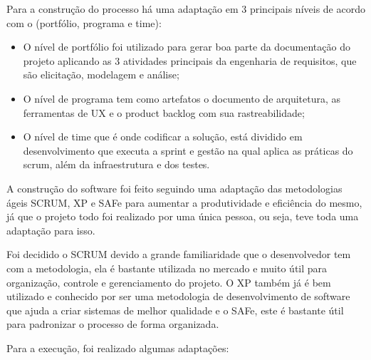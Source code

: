 Para a construção do processo há uma adaptação em 3 principais níveis de acordo com o \cite{safe} (portfólio, programa e time):

\begin{itemize}
  \item O nível de portfólio foi utilizado para gerar boa parte da documentação do projeto aplicando as 3 atividades principais da engenharia de requisitos, que são elicitação, modelagem e análise;
  \item O nível de programa tem como artefatos o documento de arquitetura, as ferramentas de UX e o product backlog com sua rastreabilidade;
  \item O nível de time que é onde codificar a solução, está dividido em desenvolvimento que executa a sprint e gestão na qual aplica as práticas do scrum, além da infraestrutura e dos testes.
\end{itemize}

A construção do software foi feito seguindo uma adaptação das metodologias ágeis SCRUM, XP e SAFe para aumentar a
produtividade e eficiência do mesmo, já que o projeto todo foi realizado por uma única pessoa, ou seja, teve toda uma adaptação para isso.

Foi decidido o SCRUM devido a grande familiaridade que o desenvolvedor tem com a metodologia, ela é bastante utilizada no mercado e muito útil para organização, controle e gerenciamento do projeto. O XP também já é bem utilizado e conhecido por ser uma metodologia de desenvolvimento de software que ajuda a criar sistemas de melhor qualidade e o SAFe, este é bastante útil para padronizar o processo de forma organizada.

Para a execução, foi realizado algumas adaptações:

